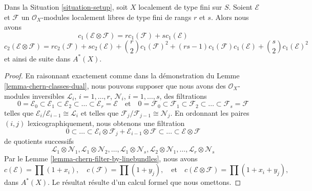 \begin{lemma}
\label{lemma-chern-classes-tensor-product}
Dans la Situation \ref{situation-setup}, soit $X$ localement de type fini sur $S$.
Soient $\mathcal{E}$ et $\mathcal{F}$ un
$\mathcal{O}_X$-modules localement libres de type fini de rangs $r$ et $s$. Alors nous avons
$$
c_1(\mathcal{E} \otimes \mathcal{F})
=
r c_1(\mathcal{F}) + s c_1(\mathcal{E})
$$
$$
c_2(\mathcal{E} \otimes \mathcal{F})
=
r c_2(\mathcal{F}) + s c_2(\mathcal{E}) +
{r \choose 2} c_1(\mathcal{F})^2 +
(rs - 1) c_1(\mathcal{F})c_1(\mathcal{E}) +
{s \choose 2} c_1(\mathcal{E})^2
$$
et ainsi de suite dans $A^*(X)$.
\end{lemma}

\begin{proof}
En raisonnant exactement comme dans la démonstration du Lemme \ref{lemma-chern-classes-dual},
nous pouvons supposer que nous avons
des $\mathcal{O}_X$-modules inversibles
${\mathcal L}_i$, $i = 1, \ldots, r$,
${\mathcal N}_i$, $i = 1, \ldots, s$,
des filtrations
$$
0 = \mathcal{E}_0 \subset \mathcal{E}_1 \subset \mathcal{E}_2
\subset \ldots \subset \mathcal{E}_r = \mathcal{E}
\quad\text{et}\quad
0 = \mathcal{F}_0 \subset \mathcal{F}_1 \subset \mathcal{F}_2
\subset \ldots \subset \mathcal{F}_s = \mathcal{F}
$$
telles que $\mathcal{E}_i/\mathcal{E}_{i - 1} \cong \mathcal{L}_i$
et telles que $\mathcal{F}_j/\mathcal{F}_{j - 1} \cong \mathcal{N}_j$.
En ordonnant les paires $(i, j)$ lexicographiquement,
nous obtenons une filtration
$$
0 \subset \ldots \subset
\mathcal{E}_i \otimes \mathcal{F}_j
+
\mathcal{E}_{i - 1} \otimes \mathcal{F}
\subset \ldots \subset \mathcal{E} \otimes \mathcal{F}
$$
de quotients successifs
$$
\mathcal{L}_1 \otimes \mathcal{N}_1,
\mathcal{L}_1 \otimes \mathcal{N}_2,
\ldots,
\mathcal{L}_1 \otimes \mathcal{N}_s,
\mathcal{L}_2 \otimes \mathcal{N}_1,
\ldots,
\mathcal{L}_r \otimes \mathcal{N}_s
$$
Par le Lemme \ref{lemma-chern-filter-by-linebundles},
nous avons
$$
c(\mathcal{E}) = \prod (1 + x_i),
\quad
c(\mathcal{F}) = \prod (1 + y_j),
\quad\text{et}\quad
c(\mathcal{E} \otimes \mathcal{F}) = \prod (1 + x_i + y_j),
$$
dans $A^*(X)$. Le résultat résulte d'un calcul formel
que nous omettons.
\end{proof}

